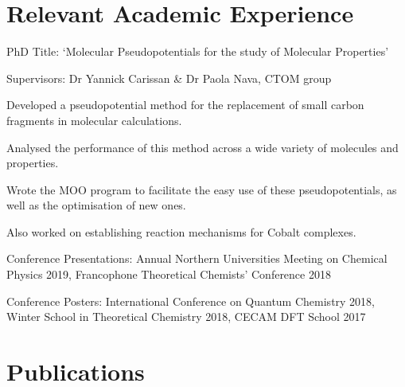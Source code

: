 \documentclass[letterpaper]{deedy-resume-openfont} %
\begin{document}
\hfill
%
%
\begin{minipage}[t]{0.66\textwidth} %


\section{Relevant Academic Experience}


\vspace{\topsep} %
\begin{tightitemize}
\item PhD Title: `Molecular Pseudopotentials for the study of Molecular Properties'
\item Supervisors: Dr Yannick Carissan \& Dr Paola Nava, CTOM group
\item Developed a pseudopotential method for the replacement of small carbon fragments in molecular calculations.
\item Analysed the performance of this method across a wide variety of molecules and properties.
\item Wrote the MOO program to facilitate the easy use of these pseudopotentials, as well as the optimisation of new ones. 
\item Also worked on establishing reaction mechanisms for Cobalt complexes.
\item Conference Presentations: Annual Northern Universities Meeting on Chemical Physics 2019, Francophone Theoretical Chemists' Conference 2018
\item Conference Posters: International Conference on Quantum Chemistry 2018, Winter School in Theoretical Chemistry 2018, CECAM DFT School 2017
\end{tightitemize}

\sectionspace %

\section{Publications} 


\end{minipage}
\end{document}
